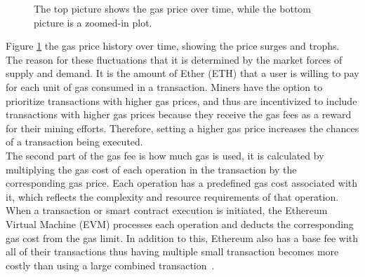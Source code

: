 \begin{figure}[!htb]
    \centering
    \begin{subfigure}[b]{\textwidth}
    \end{subfigure}
    \hfill
    \begin{subfigure}[b]{\textwidth}
        \centering
    \end{subfigure}
    \vspace{-0.8cm}
    \caption{The top picture shows the gas price over time, while the bottom picture is a zoomed-in plot.}
    \label{fig:gwei_over_time}
\end{figure}

\noindent Figure \ref{fig:gwei_over_time} the gas price history over time, showing the price surges and trophs. The reason for these fluctuations that it is determined by the market forces of supply and demand. It is the amount of Ether (ETH) that a user is willing to pay for each unit of gas consumed in a transaction. Miners have the option to prioritize transactions with higher gas prices, and thus are incentivized to include transactions with higher gas prices because they receive the gas fees as a reward for their mining efforts. Therefore, setting a higher gas price increases the chances of a transaction being executed.
\\[5mm]
The second part of the gas fee is how much gas is used, it is calculated by multiplying the gas cost of each operation in the transaction by the corresponding gas price. Each operation has a predefined gas cost associated with it, which reflects the complexity and resource requirements of that operation. When a transaction or smart contract execution is initiated, the Ethereum Virtual Machine (EVM) processes each operation and deducts the corresponding gas cost from the gas limit. In addition to this, Ethereum also has a base fee with all of their transactions thus having multiple small transaction becomes more costly than using a large combined transaction~\cite{noauthor_gas_nodate}.

